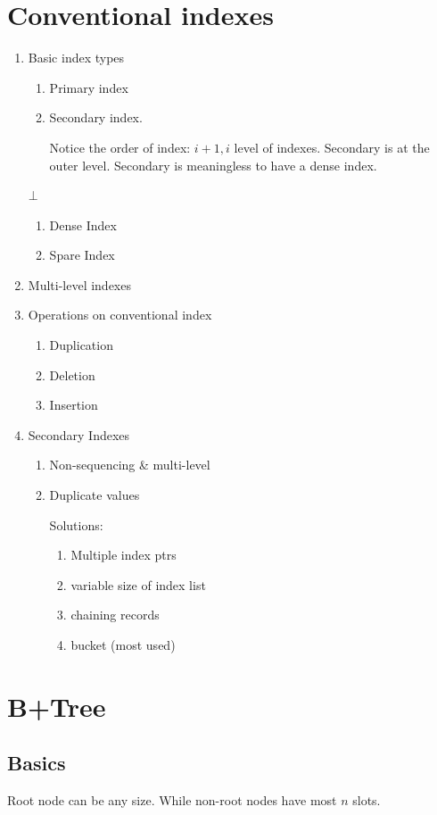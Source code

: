 \documentclass[a4paper]{report}
\begin{document}
\section{Conventional indexes}
\begin{enumerate}
\item Basic index types
  \begin{enumerate}
  \item Primary index
  \item Secondary index. 

  Notice the order of index: $i+1, i$ level of indexes. Secondary is at the outer level. Secondary is meaningless to have a dense index. 
  
  
  
  \end{enumerate}
  $\bot$
  \begin{enumerate}
  \item Dense Index
  \item Spare Index
  \end{enumerate}
\item Multi-level indexes
\item Operations on conventional index
  \begin{enumerate}
  \item Duplication
  \item Deletion
  \item Insertion
  \end{enumerate}
\item Secondary Indexes
  \begin{enumerate}
  \item Non-sequencing \& multi-level
  \item Duplicate values
  
  Solutions:
    \begin{enumerate}
    \item Multiple index ptrs
    \item variable size of index list 
    \item chaining records 
    \item bucket (most used)
    \end{enumerate}
  \end{enumerate}
\end{enumerate}
\section{B+Tree}
\subsection{Basics}
Root node can be any size. While non-root nodes have most $n$ slots.
\end{document}
